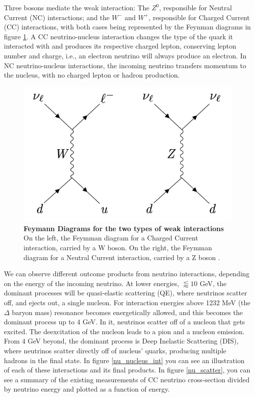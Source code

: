 Three bosons mediate the weak interaction: The $Z^{0}$, responsible for Neutral Current (NC) interactions; and the $W^{-}$ and $W^{+}$, responsible for Charged Current (CC) interactions, with both cases being represented by the Feynman diagrams in figure \ref{feymann_diag}. A CC neutrino-nucleus interaction changes the type of the quark it interacted with and produces its respective charged lepton, conserving lepton number and charge, i.e., an electron neutrino will always produce an electron. In NC neutrino-nucleus interactions, the incoming neutrino transfers momentum to the nucleus, with no charged lepton or hadron production.

\begin{figure}[h!]
	\begin{center}
		\includegraphics[scale=0.3]{Figures/feymann_diag.jpg}
		\caption[Feynman diagrams for the two types of weak interactions]{ {\textbf{Feymann Diagrams for the two types of weak interactions}} \\ On the left, the Feymman diagram for a Charged Current interaction, carried by a W boson. On the right, the Feymman diagram for a Neutral Current interaction, carried by a Z boson \cite{Lauren_thesis}.}
		\label{feymann_diag}	
	\end{center}
\end{figure}

We can observe different outcome products from neutrino interactions, depending on the energy of the incoming neutrino. At lower energies, $\lessapprox 10$ GeV, the dominant processes will be quasi-elastic scattering (QE), where neutrinos scatter off, and ejects out, a single nucleon. For interaction energies above 1232 MeV (the $\Delta$ baryon mass) resonance becomes energetically allowed, and this becomes the dominant process up to $4$ GeV. In it, neutrinos scatter off of a nucleon that gets excited. The deexcitation of the nucleon leads to a pion and a nucleon emission. From $4$ GeV beyond, the dominant process is Deep Inelastic Scattering (DIS), where neutrinos scatter directly off of nucleus' quarks, producing multiple hadrons in the final state. In figure \ref{nu_nucleus_int} you can see an illustration of each of these interactions and its final products. In figure \ref{nu_scatter}, you can see a summary of the existing measurements of CC neutrino cross-section divided by neutrino energy and plotted as a function of energy. 

